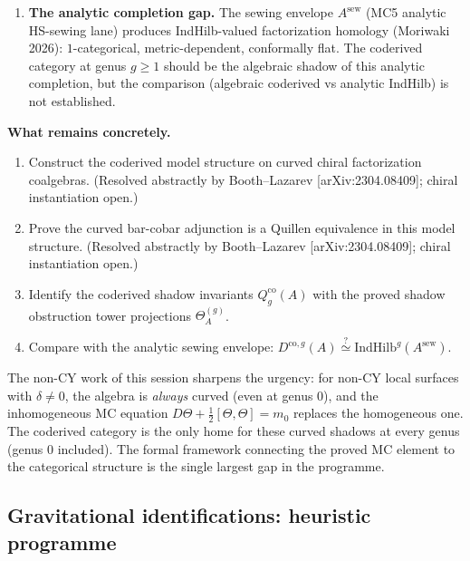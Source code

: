 \documentclass[11pt]{article}
\begin{document}
\begin{enumerate}[label=(\arabic*)]
\item \textbf{The analytic completion gap.}
 The sewing envelope $A^{\mathrm{sew}}$ (MC5 analytic HS-sewing lane) produces IndHilb-valued
 factorization homology (Moriwaki 2026): $1$-categorical, metric-dependent,
 conformally flat. The coderived category at genus $g \geq 1$ should be the
 algebraic shadow of this analytic completion, but the comparison
 (algebraic coderived vs analytic IndHilb) is not established.
\end{enumerate}

\medskip
\noindent\textbf{What remains concretely.}

\begin{enumerate}[label=\textbf{C\arabic*.}]
\item Construct the coderived model structure on curved chiral factorization coalgebras.
 (Resolved abstractly by Booth--Lazarev [arXiv:2304.08409]; chiral instantiation open.)
\item Prove the curved bar-cobar adjunction is a Quillen equivalence in this model structure.
 (Resolved abstractly by Booth--Lazarev [arXiv:2304.08409]; chiral instantiation open.)
\item Identify the coderived shadow invariants $Q_g^{\mathrm{co}}(A)$ with the proved
 shadow obstruction tower projections $\Theta_A^{(g)}$.
\item Compare with the analytic sewing envelope: $D^{\mathrm{co},g}(A) \stackrel{?}{\simeq}
 \mathrm{IndHilb}^g(A^{\mathrm{sew}})$.
\end{enumerate}

\noindent The non-CY work of this session sharpens the urgency: for non-CY local surfaces with
$\delta \neq 0$, the algebra is \emph{always} curved (even at genus $0$), and the
inhomogeneous MC equation $D\Theta + \tfrac{1}{2}[\Theta,\Theta] = m_0$ replaces the
homogeneous one. The coderived category is the only home for these curved shadows at
every genus (genus $0$ included). The formal framework connecting the proved MC element
to the categorical structure is the single largest gap in the programme.


\subsection{Gravitational identifications: heuristic programme}
\label{subsec:gravitational-heuristic}
\end{document}
